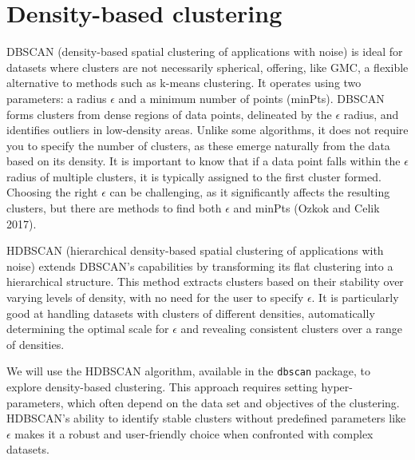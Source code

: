 \section{Density-based clustering}\label{density-based-clustering}

DBSCAN (density-based spatial clustering of applications with noise) is
ideal for datasets where clusters are not necessarily spherical,
offering, like GMC, a flexible alternative to methods such as k-means clustering.
It operates using two parameters: a radius \(\epsilon\) and a minimum
number of points (minPts). DBSCAN forms clusters from dense regions of
data points, delineated by the \(\epsilon\) radius, and identifies
outliers in low-density areas. Unlike some algorithms, it does not
require you to specify the number of clusters, as these
emerge naturally from the data based on its density. It is
important to know that if a data point falls within the \(\epsilon\)
radius of multiple clusters, it is typically assigned to the first
cluster formed. Choosing the right \(\epsilon\) can be challenging, as
it significantly affects the resulting clusters, but there are methods
to find both \(\epsilon\) and minPts (Ozkok and Celik 2017).

HDBSCAN (hierarchical density-based spatial clustering of applications
with noise) extends DBSCAN's capabilities by transforming its flat
clustering into a hierarchical structure. This method extracts clusters
based on their stability over varying levels of density, with no need for
the user to specify \(\epsilon\). It is particularly good at handling
datasets with clusters of different densities, automatically determining
the optimal scale for \(\epsilon\) and revealing consistent clusters
over a range of densities.

We will use the HDBSCAN algorithm, available in the \texttt{dbscan} package, to explore density-based clustering. This approach requires setting
hyper-parameters, which often depend on the data set and objectives of the
clustering. HDBSCAN's ability to identify stable clusters
without predefined parameters like \(\epsilon\) makes it a robust and
user-friendly choice when confronted with complex datasets.

\begin{Shaded}
\begin{Highlighting}[]

\OtherTok{\textless{}{-}}  \NormalTok{)}
\SpecialCharTok{$}
\end{Highlighting}
\end{Shaded}

